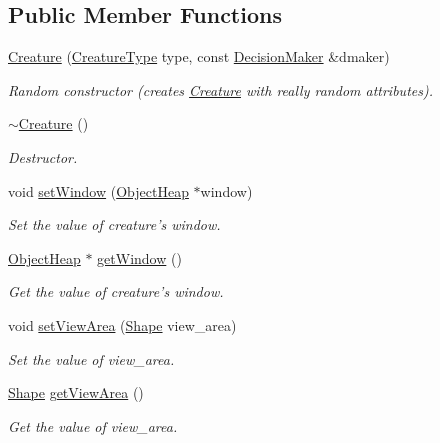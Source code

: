 \subsection*{Public Member Functions}
\begin{DoxyCompactItemize}
\item 
\hyperlink{classCreature_a2b8a9dd1201d1142d4b634a9b6d8dfa9}{Creature} (\hyperlink{BasicTypes_8h_a5bc40f1116d89138cda8ebd1a04694df}{Creature\-Type} type, const \hyperlink{classDecisionMaker}{Decision\-Maker} \&dmaker)
\begin{DoxyCompactList}\small\item\em Random constructor (creates \hyperlink{classCreature}{Creature} with really random attributes). \end{DoxyCompactList}\item 
\hyperlink{classCreature_aa991b23f4813fbdb6f875204ed49814d}{$\sim$\-Creature} ()
\begin{DoxyCompactList}\small\item\em Destructor. \end{DoxyCompactList}\item 
void \hyperlink{classCreature_af6c61c39377198bf0426ca1929bad8a0}{set\-Window} (\hyperlink{classObjectHeap}{Object\-Heap} $\ast$window)
\begin{DoxyCompactList}\small\item\em Set the value of creature's window. \end{DoxyCompactList}\item 
\hyperlink{classObjectHeap}{Object\-Heap} $\ast$ \hyperlink{classCreature_a81d5531e518837badd23f35c8e94a302}{get\-Window} ()
\begin{DoxyCompactList}\small\item\em Get the value of creature's window. \end{DoxyCompactList}\item 
void \hyperlink{classCreature_abf1ee6a67d8dc02bc2bcf6f0a4fc2277}{set\-View\-Area} (\hyperlink{classShape}{Shape} view\-\_\-area)
\begin{DoxyCompactList}\small\item\em Set the value of view\-\_\-area. \end{DoxyCompactList}\item 
\hyperlink{classShape}{Shape} \hyperlink{classCreature_ab64257a2eb713621d3ad72ce240b14ec}{get\-View\-Area} ()
\begin{DoxyCompactList}\small\item\em Get the value of view\-\_\-area. \end{DoxyCompactList}\item 

\end{DoxyCompactItemize}
